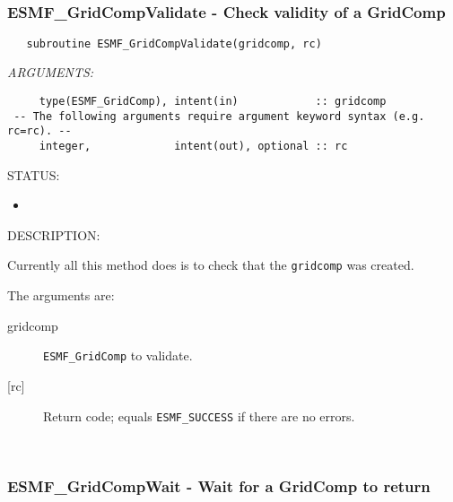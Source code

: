  
\mbox{}\hrulefill\ 
 
\subsubsection [ESMF\_GridCompValidate] {ESMF\_GridCompValidate - Check validity of a GridComp}


  
\begin{verbatim}   subroutine ESMF_GridCompValidate(gridcomp, rc)\end{verbatim}{\em ARGUMENTS:}
\begin{verbatim}     type(ESMF_GridComp), intent(in)            :: gridcomp
 -- The following arguments require argument keyword syntax (e.g. rc=rc). --
     integer,             intent(out), optional :: rc\end{verbatim}
{\sf STATUS:}
   \begin{itemize}
   \item{}
   \end{itemize}
  
{\sf DESCRIPTION:\\ }


   Currently all this method does is to check that the {\tt gridcomp}
   was created.
  
   The arguments are:
   \begin{description}
   \item[gridcomp]
     {\tt ESMF\_GridComp} to validate.
   \item[{[rc]}]
     Return code; equals {\tt ESMF\_SUCCESS} if there are no errors.
   \end{description}
   
 
\mbox{}\hrulefill\ 
 
\subsubsection [ESMF\_GridCompWait] {ESMF\_GridCompWait - Wait for a GridComp to return}


